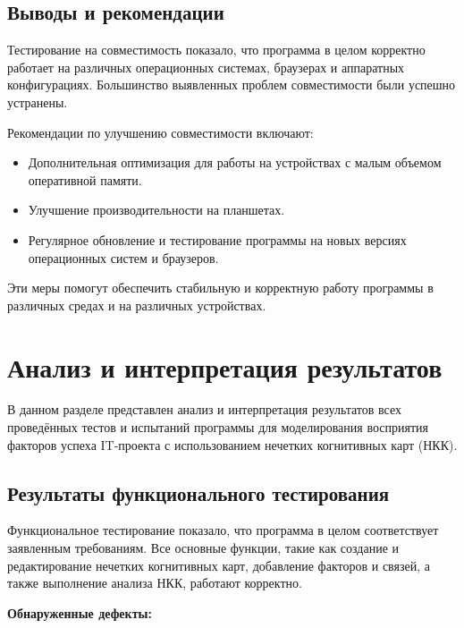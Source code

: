 \documentclass{article}
\begin{document}
    \subsection{Выводы и рекомендации}

    Тестирование на совместимость показало, что программа в целом корректно работает на различных операционных системах, браузерах и аппаратных конфигурациях. Большинство выявленных проблем совместимости были успешно устранены.

    Рекомендации по улучшению совместимости включают:

    \begin{itemize}
        \item Дополнительная оптимизация для работы на устройствах с малым объемом оперативной памяти.
        \item Улучшение производительности на планшетах.
        \item Регулярное обновление и тестирование программы на новых версиях операционных систем и браузеров.
    \end{itemize}

    Эти меры помогут обеспечить стабильную и корректную работу программы в различных средах и на различных устройствах.
    \newpage
    \section{Анализ и интерпретация результатов}
    В данном разделе представлен анализ и интерпретация результатов всех проведённых тестов и испытаний программы для моделирования восприятия факторов успеха IT-проекта с использованием нечетких когнитивных карт (НКК).

    \subsection{Результаты функционального тестирования}

    Функциональное тестирование показало, что программа в целом соответствует заявленным требованиям. Все основные функции, такие как создание и редактирование нечетких когнитивных карт, добавление факторов и связей, а также выполнение анализа НКК, работают корректно.

    \textbf{Обнаруженные дефекты:}
\end{document}
